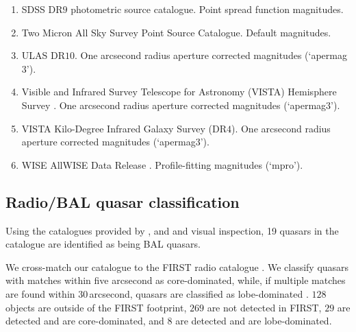 \begin{enumerate}

 \item SDSS DR$9$ \citep{ahn12} photometric source catalogue. Point spread function magnitudes. 

 \item Two Micron All Sky Survey \citep[$2$MASS;][]{skrutskie06} Point Source Catalogue. Default magnitudes.

 \item ULAS DR$10$. One arcsecond radius aperture corrected magnitudes (`apermag$3$').   

 \item Visible and Infrared Survey Telescope for Astronomy (VISTA) Hemisphere Survey \citep[VHS;][]{mcmahon13}. One arcsecond radius aperture corrected magnitudes (`apermag$3$').   

 \item VISTA Kilo-Degree Infrared Galaxy \citep[VIKING;][]{edge13} Survey (DR$4$). One arcsecond radius aperture corrected magnitudes (`apermag$3$').

 \item WISE AllWISE Data Release \citep{mainzer11}. Profile-fitting magnitudes (`mpro').

\end{enumerate}

\subsection{Radio/BAL quasar classification}
\label{sec:ch2-flags}

Using the catalogues provided by \citet{shen11}, \citet{allen11} and \citet{paris17} and visual inspection, 19 quasars in the catalogue are identified as being  BAL quasars.  

We cross-match our catalogue to the FIRST radio catalogue \citep{white97}. 
We classify quasars with matches within five arcsecond as core-dominated, while, if multiple matches are found within $30$\,arcsecond, quasars are classified as lobe-dominated \citep[e.g.][]{shen11}. 
$128$ objects are outside of the FIRST footprint, $269$ are not detected in FIRST, $29$ are detected and are core-dominated, and $8$ are detected and are lobe-dominated. 

